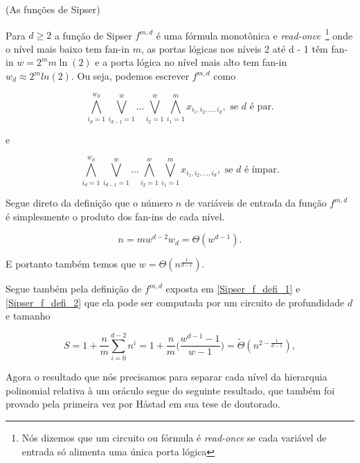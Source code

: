 \begin{defi} (As funções de Sipser) \label{Sipser_f}

Para $d \geq 2$ a função de Sipser $f^{m, d}$ é uma fórmula monotônica e \emph{read-once}~\footnote{Nós dizemos que um circuito ou fórmula é \emph{read-once} se cada variável de entrada só alimenta uma única porta lógica} onde o nível mais baixo tem fan-in $m$, as portas lógicas nos níveis 2 até d - 1 têm fan-in $w = 2^{m}m \ln(2)$ e a porta lógica no nível mais alto tem fan-in $w_{d} \approx 2^{m} ln(2)$. Ou seja, podemos escrever $f^{m, d}$ como

\begin{equation} \label{Sipser_f_defi_1}
	\bigwedge_{i_{d}  = 1}^{w_{d}}\bigvee_{i_{d - 1} = 1}^{w} \dots \bigvee_{i_{2} = 1}^{w} \bigwedge_{i_{1} = 1}^{m} x_{i_{1}, i_{2}, \dots, i_{d}}, \text{ se } d \text{ é par.}
\end{equation}

e

\begin{equation} \label{Sipser_f_defi_2}
	\bigwedge_{i_{d}  = 1}^{w_{d}}\bigvee_{i_{d - 1} = 1}^{w} \dots \bigwedge_{i_{2} = 1}^{w} \bigvee_{i_{1} = 1}^{m} x_{i_{1}, i_{2}, \dots, i_{d}}, \text{ se } d \text{ é ímpar.}
\end{equation}

\end{defi}

Segue direto da definição que o número $n$ de variáveis de entrada da função $f^{m, d}$ é simplesmente o produto dos fan-ins de cada nível.

\begin{equation*}
	n = mw^{d - 2}w_{d} = \Theta(w^{d - 1}).
\end{equation*}

E portanto também temos que $w = \Theta(n^{\frac{1}{d - 1}})$.

Segue também pela definição de $f^{m, d}$ exposta em \ref{Sipser_f_defi_1} e \ref{Sipser_f_defi_2} que ela pode ser computada por um circuito de profundidade $d$ e tamanho

\begin{equation*}
	S = 1 + \frac{n}{m}\sum_{i = 0}^{d - 2} n^{i} = 1 + \frac{n}{m}\Big(\frac{w^{d - 1} - 1}{w - 1}\Big) = \widetilde{\Theta}(n^{2 - \frac{1}{d - 1}}),
\end{equation*}

Agora o resultado que nós precisamos para separar cada nível da hierarquia polinomial relativa à um oráculo segue do seguinte resultado, que também foi provado pela primeira vez por Håstad em sua tese de doutorado.

